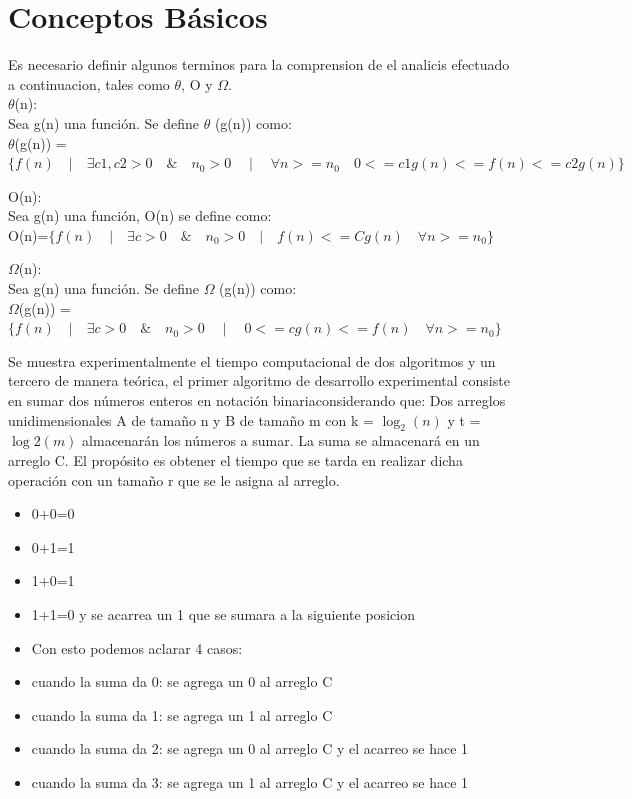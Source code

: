 \documentclass[spanish]{article}
\begin{document}
	\section{Conceptos B\'asicos}
	Es necesario definir algunos terminos para la comprension de el analicis efectuado a continuacion, tales como $\theta$, O y $\Omega$.\\
	 	$\theta$(n):\\
		Sea g(n) una función. Se define  $\theta$ (g(n)) como:\\
		
		 	$\theta$(g(n)) = $\{ f(n) \quad | \quad \exists c1,c2>0 \quad \& \quad n_{0}>0 \quad \mid \quad \forall n>=n_{0} \quad 0<= c1g(n) <= f(n) <= c2g(n) \}$
	\bigskip		 	
		 	
	O(n):\\
		Sea  g(n)  una función, O(n) se define como:\\
		
			\hspace{1cm}O(n)=$\{f(n) \quad | \quad \exists c >0 \quad \& \quad n_{0}>0 \quad | \quad f(n) <= Cg(n) \quad \forall  n>= n_{0} \}$
	\bigskip
	
	$\Omega$(n):\\
	Sea  g(n)  una función. Se define $\Omega$ (g(n)) como:\\

		\hspace{1cm}$\Omega$(g(n)) =$\{f(n) \quad | \quad \exists c >0 \quad \& \quad n_{0}>0 \quad \mid \quad  0<= cg(n)<= f(n) \quad \forall n>= n_{0} \}$
	\bigskip

	Se muestra experimentalmente el tiempo computacional de dos algoritmos y un tercero de manera teórica, 
	el primer algoritmo de desarrollo experimental consiste en sumar dos números enteros en notación binariaconsiderando que: 
	Dos arreglos unidimensionales A de tamaño n y B de tamaño m con k = $\log_{2}(n)$ y t = $\log{2}(m)$ almacenarán los números a sumar. 
	La suma se almacenará en un arreglo C. El propósito es obtener el tiempo que se tarda en realizar dicha operación con un tamaño r que se le asigna al arreglo.
	



\begin{itemize}
	\item 0+0=0
	\item 0+1=1
	\item 1+0=1
	\item 1+1=0 y se acarrea un 1 que se sumara a la siguiente posicion
	\item Con esto podemos aclarar 4 casos:
	\item cuando la suma da 0: se agrega un 0 al arreglo C
	\item cuando la suma da 1: se agrega un 1 al arreglo C
	\item cuando la suma da 2: se agrega un 0  al arreglo C y el acarreo se hace 1
	\item cuando la suma da 3: se agrega un 1 al arreglo C y el acarreo se hace 1
\end{itemize}
\end{document}

